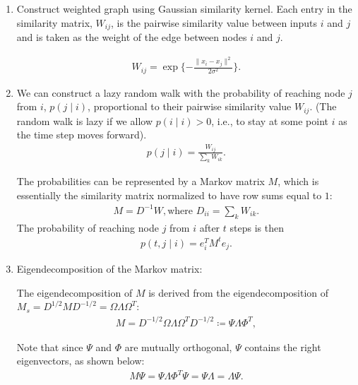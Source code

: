 \documentclass{article}
\begin{document}
\begin{enumerate}
    \item Construct weighted graph using Gaussian similarity kernel. Each entry in the similarity matrix, $W_{i j}$, is the pairwise similarity value between inputs $i$ and $j$ and is taken as the weight of the edge between nodes $i$ and $j$. 
    
    \begin{align}
        W_{i j } = \exp\{-\frac{\|x_i - x_j\|^2}{2\sigma^2}\}.
    \end{align}
    
    \item We can construct a lazy random walk with the probability of reaching node $j$ from $i$, $p(j \mid i)$, proportional to their pairwise similarity value $W_{i j}$. (The random walk is lazy if we allow $p(i\mid i) > 0$, i.e., to stay at some point $i$ as the time step moves forward). 
    \begin{align}
        p(j\mid i) = \frac{W_{i j}}{\sum_{k} W_{i k}}.
    \end{align}
    
    The probabilities can be represented by a Markov matrix $M$, which is essentially the similarity matrix normalized to have row sums equal to $1$:
     \begin{align}
        M = D^{-1} W, \text{where } D_{i i} =\sum_{k}W_{i k}.
    \end{align}
    The probability of reaching node $j$ from $i$ after $t$ steps is then
    \begin{align}
        p(t,j\mid i) = e_i^T M^t e_j.
    \end{align}

    \item Eigendecomposition of the Markov matrix:
    
    The eigendecomposition of $M$ is derived from the eigendecomposition of $M_s = D^{1/2} M D^{-1/2} = \Omega \Lambda \Omega^T$:
    \begin{align}
        M = D^{-1/2}  \Omega \Lambda \Omega^T D^{-1/2} \coloneqq \Psi \Lambda \Phi^T,
    \end{align}
    
    Note that since $\Psi$ and $\Phi$ are mutually orthogonal, $\Psi$ contains the right eigenvectors, as shown below:
     \begin{align}
        M \Psi =  \Psi \Lambda \Phi^T \Psi = \Psi \Lambda =  \Lambda \Psi.
    \end{align}
    

\end{enumerate}
\end{document}
